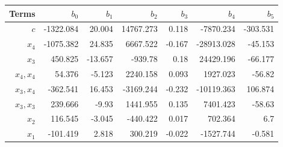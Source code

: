 \begin{tabular}{rrrrrrr}
Terms & $b_0$ & $b_1$ & $b_2$ & $b_3$ & $b_4$ & $b_5$ \\ 
\hline 
$c$ & -1322.084 & 20.004 & 14767.273 & 0.118 & -7870.234 & -303.531 \\ 
$x_4$ & -1075.382 & 24.835 & 6667.522 & -0.167 & -28913.028 & -45.153 \\ 
$x_3$ & 450.825 & -13.657 & -939.78 & 0.18 & 24429.196 & -66.177 \\ 
$x_4,x_4$ & 54.376 & -5.123 & 2240.158 & 0.093 & 1927.023 & -56.82 \\ 
$x_3,x_4$ & -362.541 & 16.453 & -3169.244 & -0.232 & -10119.363 & 106.874 \\ 
$x_3,x_3$ & 239.666 & -9.93 & 1441.955 & 0.135 & 7401.423 & -58.63 \\ 
$x_2$ & 116.545 & -3.045 & -440.422 & 0.017 & 702.364 & 6.7 \\ 
$x_1$ & -101.419 & 2.818 & 300.219 & -0.022 & -1527.744 & -0.581 \\ 
\hline 
\end{tabular}